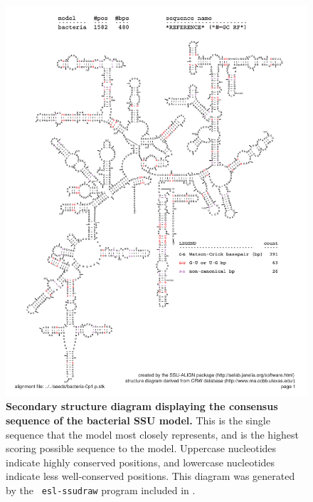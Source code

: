 \begin{figure}
\begin{center}
\includegraphics[width=5.7in]{Figures/bacteria-0p1-rf}
\end{center}
\caption[Secondary structure diagram displaying the consensus sequence
  of the bacterial SSU model]{\textbf{Secondary structure diagram displaying the
  consensus sequence of the bacterial SSU model.} 
  This is the single sequence that the model 
  most closely represents, and is the highest scoring possible
  sequence to the model. Uppercase nucleotides indicate highly conserved positions,
  and lowercase nucleotides indicate less well-conserved positions.
  This diagram was generated by the {\tt
  esl-ssudraw} program included in .}
\label{fig:bacrf}
\end{figure}

